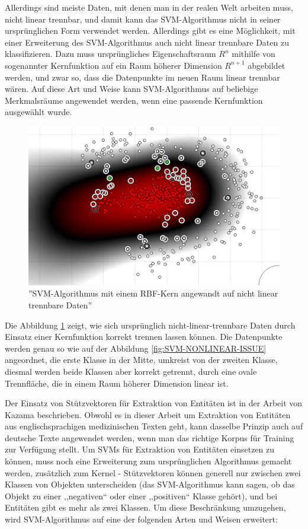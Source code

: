 Allerdings sind meiste Daten, mit denen man in der realen Welt arbeiten muss, nicht linear trennbar, und damit kann das SVM-Algorithmus nicht in seiner ursprünglichen Form verwendet werden. Allerdings gibt es eine Möglichkeit, mit einer Erweiterung des SVM-Algorithmus auch nicht linear trennbare Daten zu klassifizieren. Dazu muss ursprüngliches Eigenschaftsraum $R^n$ mithilfe von sogenannter Kernfunktion auf ein Raum höherer Dimension $R^{n+1}$ abgebildet werden, und zwar so, dass die Datenpunkte im neuen Raum linear trennbar wären\cite{Hearst:98}. Auf diese Art und Weise kann SVM-Algorithmus auf beliebige Merkmalsräume angewendet werden, wenn eine passende Kernfunktion ausgewählt wurde\cite{hsu2003practical}.

\begin{figure}
\centering
\includegraphics[width=\textwidth,angle=90]{Bilder/svm-nonlinear-rbf.png}
\caption{''SVM-Algorithmus mit einem RBF-Kern angewandt auf nicht linear trennbare Daten''}
\label{fig:SVM-NONLINEAR-ISSUE-FIXED}
\end{figure}

Die Abbildung \ref{fig:SVM-NONLINEAR-ISSUE-FIXED} zeigt, wie sich ursprünglich nicht-linear-trennbare Daten durch Einsatz einer Kernfunktion korrekt trennen lassen können. Die Datenpunkte werden genau so wie auf der Abbildung \ref{fig:SVM-NONLINEAR-ISSUE} angeordnet, die erste Klasse in der Mitte, umkreist von der zweiten Klasse, diesmal werden beide Klassen aber korrekt getrennt, durch eine ovale Trennfläche, die in einem Raum höherer Dimension linear ist.

Der Einsatz von Stützvektoren für Extraktion von Entitäten ist in der Arbeit von Kazama\cite{kazama2002tuning} beschrieben. Obwohl es in dieser Arbeit um Extraktion von Entitäten aus englischsprachigen medizinischen Texten geht, kann dasselbe Prinzip auch auf deutsche Texte angewendet werden, wenn man das richtige Korpus für Training zur Verfügung stellt. Um SVMs für Extraktion von Entitäten einsetzen zu können, muss noch eine Erweiterung zum ursprünglichen Algorithmus gemacht werden, zusätzlich zum Kernel - Stützvektoren können generell nur zwischen zwei Klassen von Objekten unterscheiden (das SVM-Algorithmus kann sagen, ob das Objekt zu einer ,,negativen`` oder einer ,,positiven`` Klasse gehört), und bei Entitäten gibt es mehr als zwei Klassen. Um diese Beschränkung umzugehen, wird SVM-Algorithmus auf eine der folgenden Arten und Weisen erweitert:

